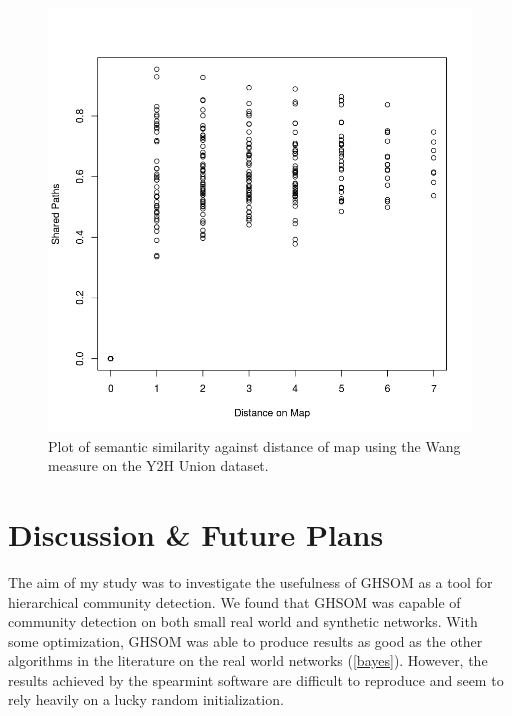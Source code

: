 \documentclass{report}
\begin{document}
	\begin{figure}
		\centering
		\includegraphics[width=\textwidth]{../semantic_results.png}
		\caption{Plot of semantic similarity against distance of map using the Wang measure on the Y2H Union dataset.}
		\label{semantic_results}
	\end{figure}
	
	

	\chapter{Discussion \& Future Plans}

	The aim of my study was to investigate the usefulness of GHSOM as a tool for hierarchical community detection. 
	We found that GHSOM was capable of community detection on both small real world and synthetic networks. 
	With some optimization, GHSOM was able to produce results as good as the other algorithms in the literature on the real world networks (\cref{bayes}). However, the results achieved by the spearmint software are difficult to reproduce and seem to rely heavily on a lucky random initialization.
	
\end{document}
